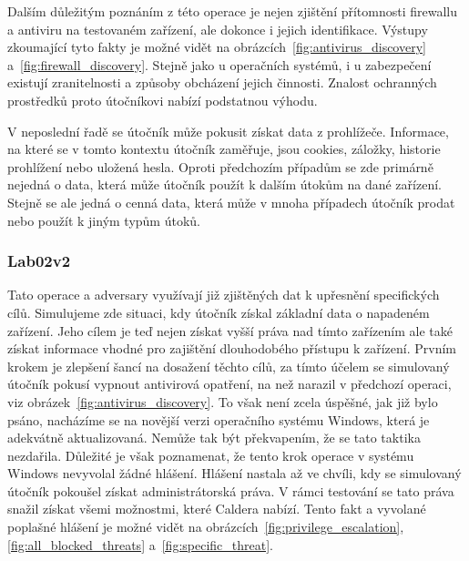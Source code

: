 Dalším důležitým poznáním z této operace je nejen zjištění přítomnosti firewallu a antiviru na testovaném zařízení, ale dokonce i jejich identifikace.
Výstupy zkoumající tyto fakty je možné vidět na obrázcích~\ref{fig:antivirus_discovery} a~\ref{fig:firewall_discovery}.
Stejně jako u operačních systémů, i u zabezpečení existují zranitelnosti a způsoby obcházení jejich činnosti.
Znalost ochranných prostředků proto útočníkovi nabízí podstatnou výhodu.


V neposlední řadě se útočník může pokusit získat data z prohlížeče.
Informace, na které se v tomto kontextu útočník zaměřuje, jsou cookies, záložky, historie prohlížení nebo uložená hesla.
Oproti předchozím případům se zde primárně nejedná o data, která může útočník použít k dalším útokům na dané zařízení.
Stejně se ale jedná o cenná data, která může v mnoha případech útočník prodat nebo použít k jiným typům útoků.

\subsubsection{Lab02v2}
Tato operace a adversary využívají již zjištěných dat k upřesnění specifických cílů.
Simulujeme zde situaci, kdy útočník získal základní data o napadeném zařízení.
Jeho cílem je teď nejen získat vyšší práva nad tímto zařízením ale také získat informace vhodné pro zajištění dlouhodobého přístupu k zařízení.
Prvním krokem je zlepšení šancí na dosažení těchto cílů, za tímto účelem se simulovaný útočník pokusí vypnout antivirová opatření, na než narazil v předchozí operaci, viz obrázek~\ref{fig:antivirus_discovery}.
To však není zcela úspěšné, jak již bylo psáno, nacházíme se na novější verzi operačního systému Windows, která je adekvátně aktualizovaná.
Nemůže tak být překvapením, že se tato taktika nezdařila.
Důležité je však poznamenat, že tento krok operace v systému Windows nevyvolal žádné hlášení.
Hlášení nastala až ve chvíli, kdy se simulovaný útočník pokoušel získat administrátorská práva.
V rámci testování se tato práva snažil získat všemi možnostmi, které Caldera nabízí.
Tento fakt a vyvolané poplašné hlášení je možné vidět na obrázcích~\ref{fig:privilege_escalation},\ref{fig:all_blocked_threats} a~\ref{fig:specific_threat}.


